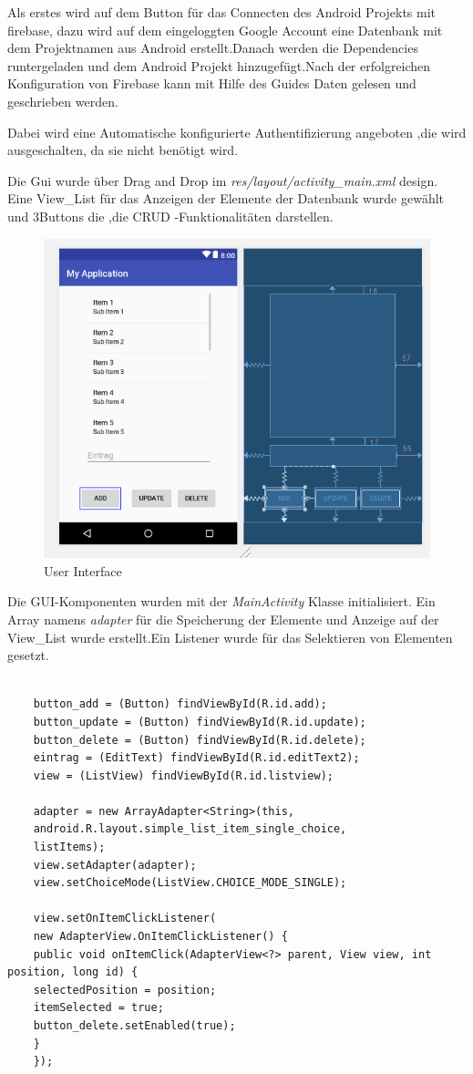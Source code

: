 Als erstes wird auf dem Button für das Connecten des Android Projekts mit firebase, dazu wird auf dem eingeloggten Google Account eine Datenbank mit dem Projektnamen aus Android erstellt.Danach werden die Dependencies runtergeladen und dem Android Projekt hinzugefügt.Nach der erfolgreichen Konfiguration von Firebase kann mit Hilfe des Guides Daten gelesen und geschrieben werden.\cite{f_readwrite}\cite{listdata}

Dabei wird eine Automatische konfigurierte Authentifizierung angeboten ,die wird ausgeschalten, da sie nicht benötigt wird.


Die Gui wurde über Drag and Drop im \textit{res/layout/activity\_main.xml} design. Eine View\_List für das Anzeigen der Elemente der Datenbank wurde gewählt und 3Buttons die ,die CRUD -Funktionalitäten darstellen.
\begin{figure}[h]
	\centering
	\includegraphics[width=0.7\linewidth]{images/gui}
	\caption{User Interface}
	\label{fig:gui}
\end{figure}
Die GUI-Komponenten wurden mit der \textit{MainActivity} Klasse initialisiert. Ein Array namens \textit{adapter} für die Speicherung der Elemente und Anzeige auf der View\_List wurde erstellt.Ein Listener wurde für das Selektieren von Elementen gesetzt.

\begin{lstlisting}[style=Java,caption={Gui, Adapter-Array für die Anzeige der Elemnete, Listener für die Selektion}]

	button_add = (Button) findViewById(R.id.add);
	button_update = (Button) findViewById(R.id.update);
	button_delete = (Button) findViewById(R.id.delete);
	eintrag = (EditText) findViewById(R.id.editText2);
	view = (ListView) findViewById(R.id.listview);
	
	adapter = new ArrayAdapter<String>(this,
	android.R.layout.simple_list_item_single_choice,
	listItems);
	view.setAdapter(adapter);
	view.setChoiceMode(ListView.CHOICE_MODE_SINGLE);
	
	view.setOnItemClickListener(
	new AdapterView.OnItemClickListener() {
	public void onItemClick(AdapterView<?> parent, View view, int position, long id) {
	selectedPosition = position;
	itemSelected = true;
	button_delete.setEnabled(true);
	}
	});
\end{lstlisting}

